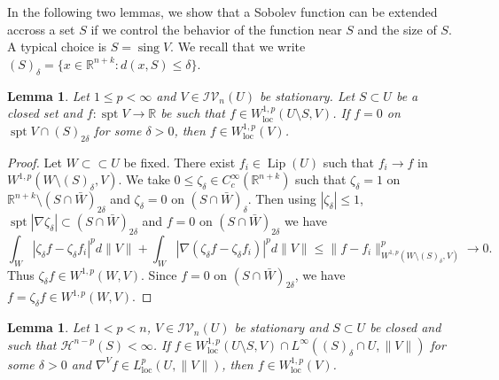\documentclass[11pt]{amsart}
\newtheorem{lemma}[theorem]{Lemma}
\theoremstyle{definition}
\newcommand{\HH}{\mathcal{H}}
\newcommand{\R}{\mathbb{R}}
\newcommand{\IV}{\mathcal{IV}}
\newcommand{\loc}{\mathrm{loc}}
\newcommand{\ssubset}{\subset\subset}
\DeclareMathOperator{\spt}{spt}
\DeclareMathOperator{\sing}{sing}
\DeclareMathOperator{\reg}{reg}
\DeclareMathOperator{\lip}{Lip}
\begin{document}
In the following two lemmas, we show that a Sobolev function can be extended accross a set $S$ if we control the behavior of the function near $S$ and the size of $S$. A typical choice is $S=\sing V$. We recall that we write $(S)_\delta=\{x\in \R^{n+k}:d(x,S)\le\delta\}$.

\begin{lemma}\label{sobolev.function.vanishing.on.singular.set}
	Let $1\le p<\infty$ and $V\in \IV_n(U)$ be stationary. 
    Let $S\subset U$ be a closed set and $f:\spt V\to \R$ be such that $f\in W^{1,p}_\loc(U\setminus S,V)$. If $f=0$ on $\spt V\cap (S)_{2\delta}$ for some $\delta>0$, then $f\in W^{1,p}_\loc(V)$.
\end{lemma}
\begin{proof}
	Let $W\ssubset U$ be fixed. 
    There exist $f_i\in \lip(U)$ such that $f_i\to f$ in $W^{1,p}(W\setminus (S)_{\delta},V)$. We take $0\le \zeta_\delta\in C_c^{\infty}(\R^{n+k})$ such that $\zeta_\delta=1$ on $\R^{n+k}\setminus (S\cap \bar W)_{2\delta}$ and $\zeta_\delta =0$ on $(S\cap \bar W)_{\delta}$. Then using $|\zeta_\delta|\le 1$, $\spt |\nabla\zeta_\delta|\subset (S\cap \bar W)_{2\delta}$ and $f=0$ on $(S\cap \bar W)_{2\delta}$ we have
	\[\int_W |\zeta_\delta f-\zeta_\delta f_i|^pd\|V\|+\int_W |\nabla(\zeta_\delta f-\zeta_\delta f_i)|^pd\|V\|\le \|f-f_i\|_{W^{1,p}(W\setminus (S)_{\delta},V)}^p\to0.\] 
	Thus $\zeta_{\delta}f\in W^{1,p}(W,V)$. Since $f=0$ on $(S\cap \bar W)_{2\delta}$, we have $f=\zeta_\delta f\in W^{1,p}(W,V)$.
\end{proof}

\begin{lemma}\label{getting.sobolev.functions}
	Let $1< p<n$, $V\in \IV_n(U)$ be stationary and $S\subset U$ be closed and such that $\HH^{n-p}(S)<\infty$. 
    If $f\in W^{1,p}_\loc( U\setminus S,V)\cap L^\infty((S)_{\delta}\cap U,\|V\|)$ for some $\delta>0$ and $\nabla ^V f\in L^p_\loc(U,\|V\|)$, then $f\in W^{1,p}_\loc(V)$.
\end{lemma}
\end{document}
